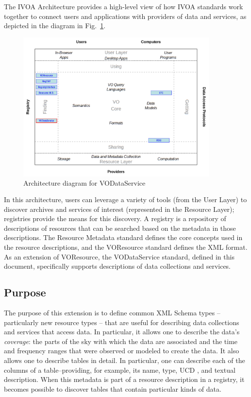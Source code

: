 \documentclass[11pt,a4paper]{ivoa}
\begin{document}
The IVOA Architecture \citep{note:VOARCH} provides a high-level
view of how IVOA standards work together to connect users and
applications with providers of data and services, as depicted in the
diagram in Fig.~\ref{fig:archdiag}.

\begin{figure}
\centering
\includegraphics[width=0.9\textwidth]{role_diagram.pdf}
\caption{Architecture diagram for VODataService}
\label{fig:archdiag}
\end{figure}




In this architecture, users can leverage a variety of tools (from the
User Layer) to discover archives and services of interest (represented
in the Resource Layer); registries provide the means for this
discovery.  A registry is a repository of descriptions of resources
that can be searched based on the metadata in those descriptions.  The
Resource Metadata standard \citep{2007ivoa.spec.0302H} defines the core
concepts used in the resource descriptions, and the VOResource
standard defines the XML format.  As an
extension of VOResource, the VODataService standard, defined in this
document, specifically supports descriptions of data collections and
services.  

\subsection{Purpose}


The purpose of this extension is to define common XML Schema
types -- particularly new resource types -- that are useful for describing
data collections and services that access data.  In particular, it
allows one to describe the data's \emph{coverage}:  the parts of the
sky with which the data are associated and the time and frequency ranges that
were observed or modeled to create the data.  It also allows one to
describe tables in detail.  In particular, one can describe each of
the columns of a table--providing, for example, its name, type, UCD
\citep{2005ivoa.spec.1231D}, 
and textual description.  When this metadata is part of a resource
description in a registry, it becomes possible
to discover tables that contain particular kinds of data.  
\end{document}
